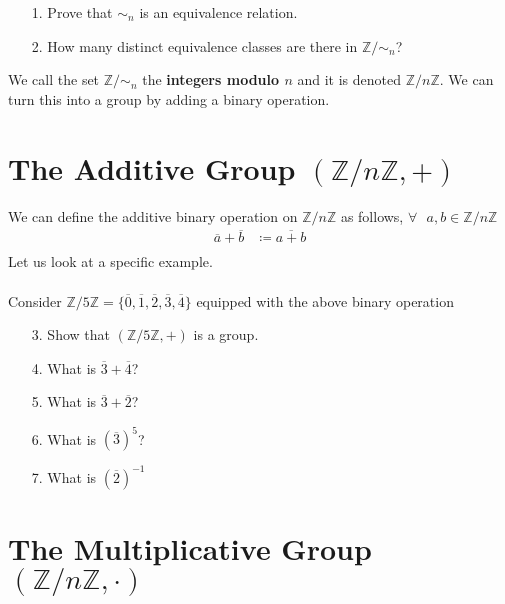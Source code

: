 \documentclass{article}
\begin{document}
\begin{itemize}
\item [1.] Prove that $\sim_{n}$ is an equivalence relation.
\item [2.] How many distinct equivalence classes are there in $\mathbb{Z}/\sim_{n}$?
\end{itemize}

We call the set $\mathbb{Z}/\sim_{n}$  the \textbf{integers modulo $n$} and it is denoted $\mathbb{Z}/n\mathbb{Z}$.
We can turn this into a group by adding a binary operation.

\section{The Additive Group $(\mathbb{Z}/n\mathbb{Z}, +)$}

We can define the additive binary operation on $\mathbb{Z}/n\mathbb{Z}$ as follows, $\forall\text{ }a,b\in\mathbb{Z}/n\mathbb{Z}$
\begin{align*}
  \overline{a} + \overline{b} &\coloneq \overline{a+b}\\
\end{align*}
  Let us look at a specific example.
  \\\\Consider $\mathbb{Z}/5\mathbb{Z} = \{\overline{0}, \overline{1}, \overline{2}, \overline{3}, \overline{4}\}$ equipped with the above binary operation
  \begin{itemize}
  \item [3.] Show that $(\mathbb{Z}/5\mathbb{Z}, +)$ is a group.
  \item [4.] What is $\overline{3} + \overline{4}$?
  \item [5.] What is $\overline{3} + \overline{2}$?
  \item [6.] What is $(\overline{3})^5$?
  \item [7.] What is $(\overline{2})^{-1}$
  \end{itemize}

\section{The Multiplicative Group $(\mathbb{Z}/n\mathbb{Z}, \cdot)$}
\end{document}
